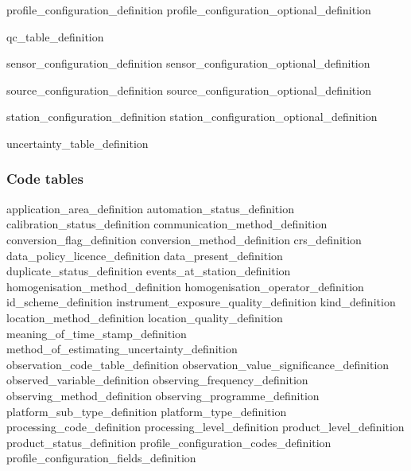 \documentclass[a4paper,12pt]{article}
\begin{document}
 {profile_configuration_definition}
 {profile_configuration_optional_definition}

 {qc_table_definition}

 {sensor_configuration_definition}
 {sensor_configuration_optional_definition}

 {source_configuration_definition}
 {source_configuration_optional_definition}

 {station_configuration_definition} %
 {station_configuration_optional_definition} %

 {uncertainty_table_definition}


\FloatBarrier
\newpage
\subsubsection {Code tables}
 {application_area_definition} %
 {automation_status_definition} %
 {calibration_status_definition} %
 {communication_method_definition} %
 {conversion_flag_definition} %
 {conversion_method_definition} %
 {crs_definition} %
 {data_policy_licence_definition} %
 {data_present_definition} %
 {duplicate_status_definition} %
 {events_at_station_definition} %
 {homogenisation_method_definition}
 {homogenisation_operator_definition}
 {id_scheme_definition} %
 {instrument_exposure_quality_definition} %
 {kind_definition} %
 {location_method_definition} %
 {location_quality_definition} %
 {meaning_of_time_stamp_definition} %
 {method_of_estimating_uncertainty_definition} %
 {observation_code_table_definition} %
 {observation_value_significance_definition} %
 {observed_variable_definition} %
 {observing_frequency_definition} %
 {observing_method_definition} %
 {observing_programme_definition} %
 {platform_sub_type_definition} %
 {platform_type_definition} %
 {processing_code_definition} %
 {processing_level_definition} %
 {product_level_definition} %
 {product_status_definition} %
 {profile_configuration_codes_definition}
 {profile_configuration_fields_definition}
\end{document}
